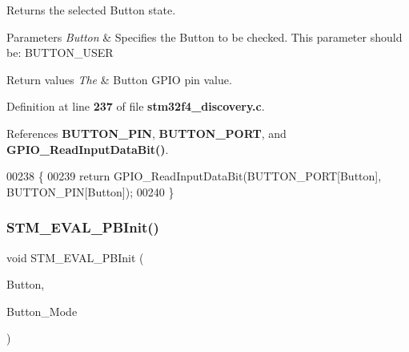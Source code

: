 Returns the selected Button state. 


\begin{DoxyParams}{Parameters}
{\em Button} & Specifies the Button to be checked. This parameter should be\+: B\+U\+T\+T\+O\+N\+\_\+\+U\+S\+ER \\
\hline
\end{DoxyParams}

\begin{DoxyRetVals}{Return values}
{\em The} & Button G\+P\+IO pin value. \\
\hline
\end{DoxyRetVals}


Definition at line \textbf{ 237} of file \textbf{ stm32f4\+\_\+discovery.\+c}.



References \textbf{ B\+U\+T\+T\+O\+N\+\_\+\+P\+IN}, \textbf{ B\+U\+T\+T\+O\+N\+\_\+\+P\+O\+RT}, and \textbf{ G\+P\+I\+O\+\_\+\+Read\+Input\+Data\+Bit()}.


\begin{DoxyCode}
00238 \{
00239   \textcolor{keywordflow}{return} GPIO_ReadInputDataBit(BUTTON_PORT[Button], BUTTON_PIN[Button]);
00240 \}
\end{DoxyCode}
\mbox{\label{group__STM32F4__DISCOVERY__LOW__LEVEL__Exported__Functions_ga1cdc19fe328ddcd17bf50fcb62d78369}} 
\subsubsection{S\+T\+M\+\_\+\+E\+V\+A\+L\+\_\+\+P\+B\+Init()}
{\footnotesize\ttfamily void S\+T\+M\+\_\+\+E\+V\+A\+L\+\_\+\+P\+B\+Init (\begin{DoxyParamCaption}\item[{\textbf{ Button\+\_\+\+Type\+Def}}]{Button,  }\item[{\textbf{ Button\+Mode\+\_\+\+Type\+Def}}]{Button\+\_\+\+Mode }\end{DoxyParamCaption})}



